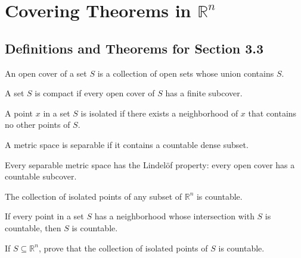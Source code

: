 \section{Covering Theorems in $\mathbb{R}^n$}

\subsection*{Definitions and Theorems for Section 3.3}

\begin{definition}
An open cover of a set $S$ is a collection of open sets whose union contains $S$.
\end{definition}

\begin{definition}
A set $S$ is compact if every open cover of $S$ has a finite subcover.
\end{definition}

\begin{definition}
A point $x$ in a set $S$ is isolated if there exists a neighborhood of $x$ that contains no other points of $S$.
\end{definition}

\begin{definition}
A metric space is separable if it contains a countable dense subset.
\end{definition}

\begin{theorem}
Every separable metric space has the Lindelöf property: every open cover has a countable subcover.
\end{theorem}

\begin{theorem}
The collection of isolated points of any subset of $\mathbb{R}^n$ is countable.
\end{theorem}

\begin{theorem}
If every point in a set $S$ has a neighborhood whose intersection with $S$ is countable, then $S$ is countable.
\end{theorem}

\begin{problembox}
If \( S \subseteq \mathbb{R}^n \), prove that the collection of isolated points of \( S \) is countable.
\end{problembox}

